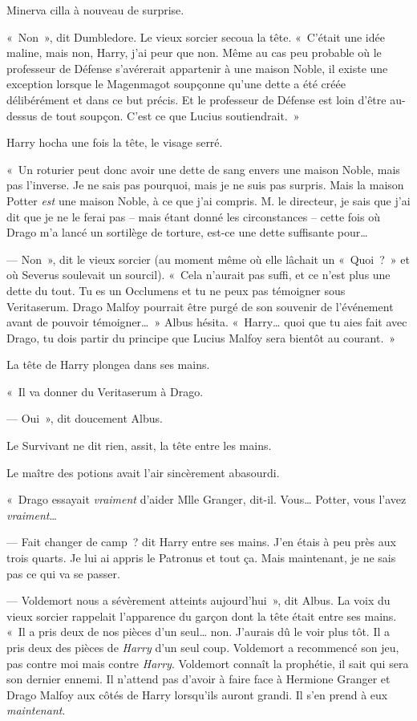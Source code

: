 Minerva cilla à nouveau de surprise.

«~Non~», dit Dumbledore. Le vieux sorcier secoua la tête. «~C'était une idée maline, mais non, Harry, j'ai peur que non. Même au cas peu probable où le professeur de Défense s'avérerait appartenir à une maison Noble, il existe une exception lorsque le Magenmagot soupçonne qu'une dette a été créée délibérément et dans ce but précis. Et le professeur de Défense est loin d'être au-dessus de tout soupçon. C'est ce que Lucius soutiendrait.~»

Harry hocha une fois la tête, le visage serré.

«~Un roturier peut donc avoir une dette de sang envers une maison Noble, mais pas l'inverse. Je ne sais pas pourquoi, mais je ne suis pas surpris. Mais la maison Potter \emph{est} une maison Noble, à ce que j'ai compris. M. le directeur, je sais que j'ai dit que je ne le ferai pas -- mais étant donné les circonstances -- cette fois où Drago m'a lancé un sortilège de torture, est-ce une dette suffisante pour…

--- Non~», dit le vieux sorcier (au moment même où elle lâchait un «~Quoi~?~» et où Severus soulevait un sourcil). «~Cela n'aurait pas suffi, et ce n'est plus une dette du tout. Tu es un Occlumens et tu ne peux pas témoigner sous Veritaserum. Drago Malfoy pourrait être purgé de son souvenir de l'événement avant de pouvoir témoigner…~» Albus hésita. «~Harry… quoi que tu aies fait avec Drago, tu dois partir du principe que Lucius Malfoy sera bientôt au courant.~»

La tête de Harry plongea dans ses mains.

«~Il va donner du Veritaserum à Drago.

--- Oui~», dit doucement Albus.

Le Survivant ne dit rien, assit, la tête entre les mains.

Le maître des potions avait l'air sincèrement abasourdi.

«~Drago essayait \emph{vraiment} d'aider Mlle Granger, dit-il. Vous… Potter, vous l'avez \emph{vraiment}…

--- Fait changer de camp~? dit Harry entre ses mains. J'en étais à peu près aux trois quarts. Je lui ai appris le Patronus et tout ça. Mais maintenant, je ne sais pas ce qui va se passer.

--- Voldemort nous a sévèrement atteints aujourd'hui~», dit Albus. La voix du vieux sorcier rappelait l'apparence du garçon dont la tête était entre ses mains. «~Il a pris deux de nos pièces d'un seul… non. J'aurais dû le voir plus tôt. Il a pris deux des pièces de \emph{Harry} d'un seul coup. Voldemort a recommencé son jeu, pas contre moi mais contre \emph{Harry}. Voldemort connaît la prophétie, il sait qui sera son dernier ennemi. Il n'attend pas d'avoir à faire face à Hermione Granger et Drago Malfoy aux côtés de Harry lorsqu'ils auront grandi. Il s'en prend à eux \emph{maintenant}.

